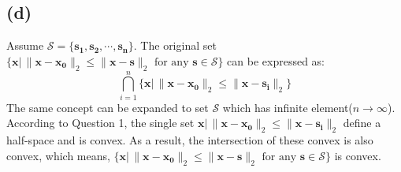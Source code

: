 \documentclass[10pt,a4paper]{article}
\begin{document}
\subsection*{(d)}
Assume $\mathcal{S} = \{ \mathbf{s_{1}}, \mathbf{s_{2}}, \cdots, \mathbf{s_{n}} \}$. The original set $\{ \mathbf{x} |\, \| \mathbf{x} - \mathbf{x_{0}} \|_{2} \leq \| \mathbf{x} - \mathbf{s} \|_{2} \text{ for any } \mathbf{s} \in \mathcal{S} \}$ can be expressed as:
\begin{equation*}
	\displaystyle\bigcap_{i = 1}^{n}\{ \mathbf{x} |\, \| \mathbf{x} - \mathbf{x_{0}} \|_{2} \leq \| \mathbf{x} - \mathbf{s_{i}} \|_{2} \}
\end{equation*}
The same concept can be expanded to set $\mathcal{S}$ which has infinite element($n \rightarrow \infty$). According to Question 1, the single set $\mathbf{x} |\, \| \mathbf{x} - \mathbf{x_{0}} \|_{2} \leq \| \mathbf{x} - \mathbf{s_{i}} \|_{2}$ define a half-space and is convex. As a result, the intersection of these convex is also convex, which means, $\{ \mathbf{x} |\, \| \mathbf{x} - \mathbf{x_{0}} \|_{2} \leq \| \mathbf{x} - \mathbf{s} \|_{2} \text{ for any } \mathbf{s} \in \mathcal{S} \}$ is convex.
\end{document}
